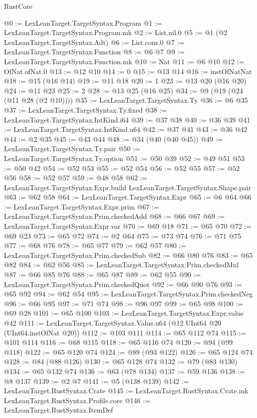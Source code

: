 \begin{lexlean}{RustCore}
\begin{coremodule}
@0 := LexLeanTarget.TargetSyntax.Program
@1 := LexLeanTarget.TargetSyntax.Program.mk
@2 := List.nil.{0}
@5 := @1 (@2 LexLeanTarget.TargetSyntax.Adt)
@6 := List.cons.{0}
@7 := LexLeanTarget.TargetSyntax.Function
@8 := @6 @7
@9 := LexLeanTarget.TargetSyntax.Function.mk
@10 := Nat
@11 := @6 @10
@12 := OfNat.ofNat.{0}
@13 := @12 @10
@14 := 0
@15 := @13 @14
@16 := instOfNatNat
@18 := @15 (@16 @14)
@19 := @11 @18
@20 := 1
@23 := @13 @20 (@16 @20)
@24 := @11 @23
@25 := 2
@28 := @13 @25 (@16 @25)
@34 := @9 (@19 (@24 (@11 @28 (@2 @10))))
@35 := LexLeanTarget.TargetSyntax.Ty
@36 := @6 @35
@37 := LexLeanTarget.TargetSyntax.Ty.fixed
@38 := LexLeanTarget.TargetSyntax.IntKind.i64
@39 := @37 @38
@40 := @36 @39
@41 := LexLeanTarget.TargetSyntax.IntKind.u64
@42 := @37 @41
@43 := @36 @42
@44 := @2 @35
@45 := @43 @44
@48 := @34 (@40 (@40 @45))
@49 := LexLeanTarget.TargetSyntax.Ty.pair
@50 := LexLeanTarget.TargetSyntax.Ty.option
@51 := @50 @39
@52 := @49 @51
@53 := @50 @42
@54 := @52 @53
@55 := @52 @54
@56 := @52 @55
@57 := @52 @56
@58 := @52 @57
@59 := @48 @58
@62 := LexLeanTarget.TargetSyntax.Expr.build LexLeanTarget.TargetSyntax.Shape.pair
@63 := @62 @58
@64 := LexLeanTarget.TargetSyntax.Expr
@65 := @6 @64
@66 := LexLeanTarget.TargetSyntax.Expr.prim
@67 := LexLeanTarget.TargetSyntax.Prim.checkedAdd
@68 := @66 @67
@69 := LexLeanTarget.TargetSyntax.Expr.var
@70 := @69 @18
@71 := @65 @70
@72 := @69 @23
@73 := @65 @72
@74 := @2 @64
@75 := @73 @74
@76 := @71 @75
@77 := @68 @76
@78 := @65 @77
@79 := @62 @57
@80 := LexLeanTarget.TargetSyntax.Prim.checkedSub
@82 := @66 @80 @76
@83 := @65 @82
@84 := @62 @56
@85 := LexLeanTarget.TargetSyntax.Prim.checkedMul
@87 := @66 @85 @76
@88 := @65 @87
@89 := @62 @55
@90 := LexLeanTarget.TargetSyntax.Prim.checkedQuot
@92 := @66 @90 @76
@93 := @65 @92
@94 := @62 @54
@95 := LexLeanTarget.TargetSyntax.Prim.checkedNeg
@96 := @66 @95
@97 := @71 @74
@98 := @96 @97
@99 := @65 @98
@100 := @69 @28
@101 := @65 @100
@103 := LexLeanTarget.TargetSyntax.Expr.value @42
@111 := LexLeanTarget.TargetSyntax.Value.u64 (@12 UInt64 @20 (UInt64.instOfNat @20))
@112 := @103 @111
@114 := @65 @112 @74
@115 := @101 @114
@116 := @68 @115
@118 := @65 @116 @74
@120 := @94 (@99 @118)
@122 := @65 @120 @74
@124 := @89 (@93 @122)
@126 := @65 @124 @74
@128 := @84 (@88 @126)
@130 := @65 @128 @74
@132 := @79 (@83 @130)
@134 := @65 @132 @74
@136 := @63 (@78 @134)
@137 := @59 @136
@138 := @8 @137
@139 := @2 @7
@141 := @5 (@138 @139)
@142 := LexLeanTarget.RustSyntax.Crate
@145 := LexLeanTarget.RustSyntax.Crate.mk LexLeanTarget.RustSyntax.Profile.core
@146 := LexLeanTarget.RustSyntax.ItemDef

\end{coremodule}
\end{lexlean}
